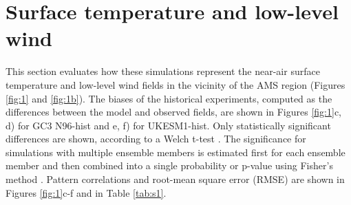 




 

%


\section{Surface temperature and low-level wind} \label{sq:clim}



This section evaluates how these simulations represent the near-air surface temperature and low-level wind fields in the vicinity of the AMS region (Figures \ref{fig:1} and \ref{fig:1b}). %
The biases of the historical experiments, computed as the differences between the model and observed fields, are shown in Figures \ref{fig:1}c, d) for GC3 N96-hist and e, f) for UKESM1-hist.
 Only statistically significant differences are shown, according to a Welch t-test \citep{wilks2011}. The significance for simulations with multiple ensemble members is estimated first for each ensemble member and then combined into a single probability or p-value using Fisher's method \citep{fisher1992statistical}. Pattern correlations and root-mean square error (RMSE) are shown in Figures \ref{fig:1}c-f and in Table \ref{tab:s1}.
 
